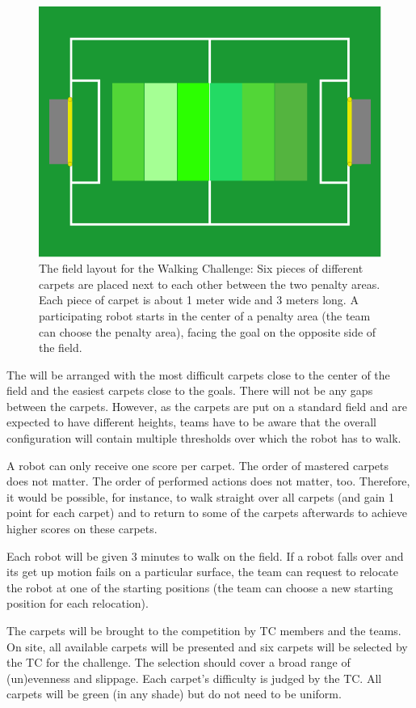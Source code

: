 \documentclass[12pt]{article}
\begin{document}
\begin{figure}[th!]
\centerline{\includegraphics[width=0.6\columnwidth]{figures/walking-challenge}}
\caption{The field layout for the Walking Challenge: Six pieces of different carpets are placed next to each other between the two penalty areas. Each piece of carpet is about 1 meter wide and 3 meters long. A participating robot starts in the center of a penalty area (the team can choose the penalty area), facing the goal on the opposite side of the field.}
\label{fig:walking_challenge}
\end{figure}

The will be arranged with the most difficult carpets close to the center of the field and the easiest carpets close to the goals. There will not be any gaps between the carpets. However, as the carpets are put on a standard field and are expected to have different heights, teams have to be aware that the overall configuration will contain multiple thresholds over which the robot has to walk.

A robot can only receive one score per carpet. The order of mastered carpets does not matter. The order of performed actions does not matter, too. Therefore, it would be possible, for instance, to walk straight over all carpets (and gain 1 point for each carpet) and to return to some of the carpets afterwards to achieve higher scores on these carpets.

Each robot will be given 3 minutes to walk on the field. If a robot falls over and its get up motion fails on a particular surface, the team can request to relocate the robot at one of the starting positions (the team can choose a new starting position for each relocation).

The carpets will be brought to the competition by TC members and the teams. On site, all available carpets will be presented and six carpets will be selected by the TC for the challenge. The selection should cover a broad range of (un)evenness and slippage. Each carpet's difficulty is judged by the TC. All carpets will be green (in any shade) but do not need to be uniform.
\end{document}

